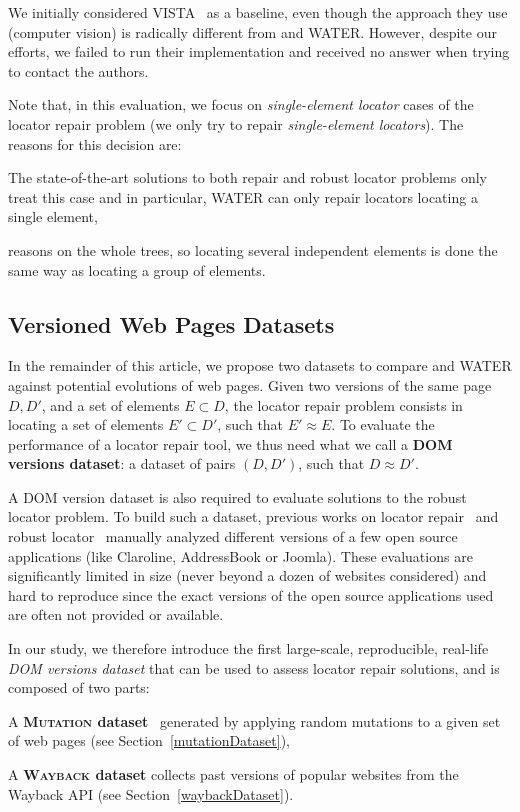 \documentclass[preprint, 12pt]{elsarticle}
\begin{document}
We initially considered VISTA~\cite{stocco2018visual} as a baseline, even though the approach they use (computer vision) is radically different from \erratum{} and WATER.
However, despite our efforts, we failed to run their implementation and received no answer when trying to contact the authors. 

Note that, in this evaluation, we focus on \textit{single-element locator} cases of the locator repair problem (we only try to repair \textit{single-element locators}).
The reasons for this decision are:
\begin{inparaenum}
    \item The state-of-the-art solutions to both repair and robust locator problems only treat this case and in particular, WATER can only repair locators locating a single element,
    \item \erratum{} reasons on the whole trees, so locating several independent elements is done the same way as locating a group of elements.
\end{inparaenum}

\subsection{Versioned Web Pages Datasets}
In the remainder of this article, we propose two datasets to compare \erratum{} and WATER against potential evolutions of web pages.
Given two versions of the same page $D, D'$, and a set of elements $E \subset D$, the locator repair problem consists in locating a set of elements $E' \subset D'$, such that $E' \approx E$.
To evaluate the performance of a locator repair tool, we thus need what we call a \textbf{DOM versions dataset}: a dataset of pairs $(D, D')$, such that $D \approx D'$.

A DOM version dataset is also required to evaluate solutions to the robust locator problem.
To build such a dataset, previous works on locator repair~\cite{leotta2016robula+,leotta2014reducing} and robust locator~\cite{stocco2018visual,choudhary2011water,hammoudi2016waterfall} manually analyzed different versions of a few open source applications (like Claroline, AddressBook or Joomla).
These evaluations are significantly limited in size (never beyond a dozen of websites considered) and hard to reproduce since the exact versions of the open source applications used are often not provided or available.

In our study, we therefore introduce the first large-scale, reproducible, real-life \textit{DOM versions dataset} that can be used to assess locator repair solutions, and is composed of two parts:
\begin{compactenum}
    \item A {\bf \textsc{Mutation} dataset}~\cite{brisset2020sftm} generated by applying random mutations to a given set of web pages (see Section~\ref{mutationDataset}),
    \item A {\bf \textsc{Wayback} dataset} collects past versions of popular websites from the Wayback API (see Section~\ref{waybackDataset}).
\end{compactenum}
\end{document}
